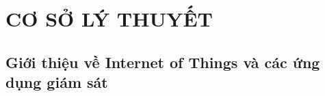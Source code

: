 
\chapter{CƠ SỞ LÝ THUYẾT}

\ifpdf
    \graphicspath{{Chapter2/Figs/Raster/}{Chapter2/Figs/PDF/}{Chapter2/Figs/}{Chapter2/Figs/web/}}
\else
    \graphicspath{{Chapter2/Figs/Vector/}{Chapter2/Figs/}}
\fi


\section{Giới thiệu về Internet of Things và các ứng dụng giám sát}
